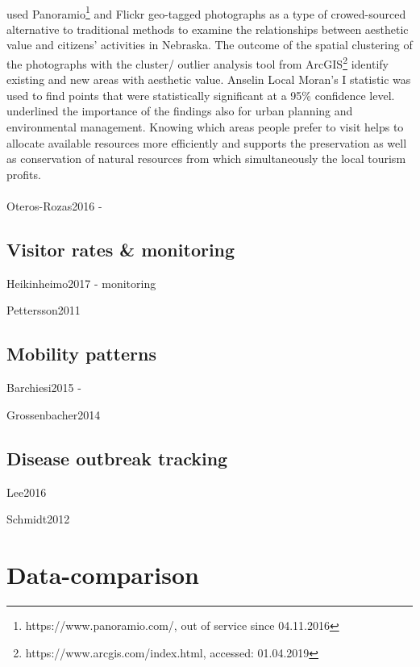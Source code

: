 \paragraph*{\textcite{Figueroa-Alfaro2017}} used Panoramio\footnote{https://www.panoramio.com/, out of service since 04.11.2016} and Flickr geo-tagged photographs as a type of crowed-sourced alternative to traditional methods to examine the relationships between aesthetic value and citizens' activities in Nebraska. The outcome of the spatial clustering of the photographs with the cluster/ outlier analysis tool from ArcGIS\footnote{https://www.arcgis.com/index.html, accessed: 01.04.2019} identify existing and new areas with aesthetic value. Anselin Local Moran's I statistic was used to find points that were statistically significant at a 95\% confidence level. \citeauthor{Figueroa-Alfaro2017} underlined the importance of the findings also for urban planning and environmental management. Knowing which areas people prefer to visit helps to allocate available resources more efficiently and supports the preservation as well as conservation of natural resources from which simultaneously the local tourism profits.

\paragraph*{\textcite{Yoshimura2017}} 

Oteros-Rozas2016 -

\subsection{Visitor rates \& monitoring }
Heikinheimo2017 - monitoring

Pettersson2011

\subsection{Mobility patterns}
Barchiesi2015 - 

Grossenbacher2014

\subsection{Disease outbreak tracking}
Lee2016

Schmidt2012



\section{Data-comparison}
